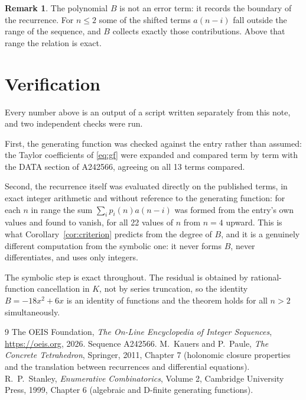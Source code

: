 \documentclass[11pt,a4paper]{article}
\theoremstyle{plain}
\theoremstyle{definition}
\newtheorem{remark}[theorem]{Remark}
\begin{document}
\begin{remark}
The polynomial $B$ is not an error term: it records the boundary of the recurrence. For
$n\le2$ some of the shifted terms $a(n-i)$ fall outside the range of the sequence,
and $B$ collects exactly those contributions. Above that range the relation is exact.
\end{remark}

\section{Verification}

Every number above is an output of a script written separately from this note, and two
independent checks were run.

First, the generating function was checked against the entry rather than assumed: the
Taylor coefficients of \eqref{eq:gf} were expanded and compared term by term with the DATA
section of A242566, agreeing on all 13 terms compared.

Second, the recurrence itself was evaluated directly on the published terms, in exact
integer arithmetic and without reference to the generating function: for each $n$ in range
the sum $\sum_{i}p_{i}(n)a(n-i)$ was formed from the entry's own values and found to
vanish, for all 22 values of $n$ from $n=4$ upward. This is what
Corollary~\ref{cor:criterion} predicts from the degree of $B$, and it is a genuinely
different computation from the symbolic one: it never forms $B$, never differentiates, and
uses only integers.

The symbolic step is exact throughout. The residual is obtained by rational-function
cancellation in $K$, not by series truncation, so the identity $B=- 18 x^{2} + 6 x$ is an
identity of functions and the theorem holds for all $n>2$ simultaneously.

\begin{thebibliography}{9}
 The OEIS Foundation, \emph{The On-Line Encyclopedia of Integer Sequences},
\url{https://oeis.org}, 2026. Sequence A242566.
 M.~Kauers and P.~Paule, \emph{The Concrete Tetrahedron}, Springer, 2011,
Chapter 7 (holonomic closure properties and the translation between recurrences and
differential equations).
 R.~P.~Stanley, \emph{Enumerative Combinatorics}, Volume 2, Cambridge
University Press, 1999, Chapter 6 (algebraic and D-finite generating functions).
\end{thebibliography}
\end{document}
